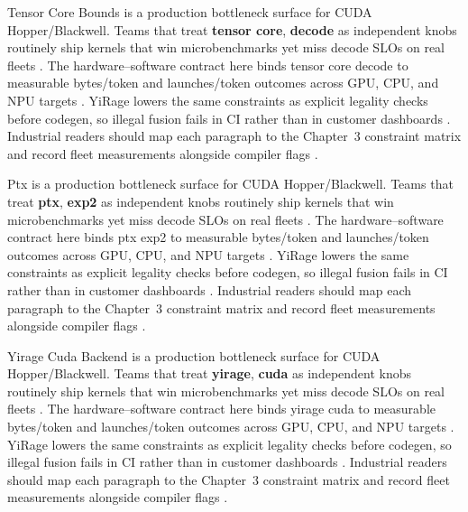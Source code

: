Tensor Core Bounds is a production bottleneck surface for CUDA Hopper/Blackwell. Teams that treat \textbf{tensor core}, \textbf{decode} as independent knobs routinely ship kernels that win microbenchmarks yet miss decode SLOs on real fleets \citep{nvidia2022hopper,amd2024aie}. The hardware--software contract here binds tensor core decode to measurable bytes/token and launches/token outcomes across GPU, CPU, and NPU targets \citep{semianalysis2024tma,dlbook}. YiRage lowers the same constraints as explicit legality checks before codegen, so illegal fusion fails in CI rather than in customer dashboards \citep{amd2024xdna,dao2022flashattention}. Industrial readers should map each paragraph to the Chapter~3 constraint matrix and record fleet measurements alongside compiler flags \citep{amd2024aie,kwon2023vllm}.

Ptx is a production bottleneck surface for CUDA Hopper/Blackwell. Teams that treat \textbf{ptx}, \textbf{exp2} as independent knobs routinely ship kernels that win microbenchmarks yet miss decode SLOs on real fleets \citep{semianalysis2024tma,dlbook}. The hardware--software contract here binds ptx exp2 to measurable bytes/token and launches/token outcomes across GPU, CPU, and NPU targets \citep{amd2024xdna,dao2022flashattention}. YiRage lowers the same constraints as explicit legality checks before codegen, so illegal fusion fails in CI rather than in customer dashboards \citep{amd2024aie,kwon2023vllm}. Industrial readers should map each paragraph to the Chapter~3 constraint matrix and record fleet measurements alongside compiler flags \citep{dlbook,nvidia2024cudagraphs}.

Yirage Cuda Backend is a production bottleneck surface for CUDA Hopper/Blackwell. Teams that treat \textbf{yirage}, \textbf{cuda} as independent knobs routinely ship kernels that win microbenchmarks yet miss decode SLOs on real fleets \citep{amd2024xdna,dao2022flashattention}. The hardware--software contract here binds yirage cuda to measurable bytes/token and launches/token outcomes across GPU, CPU, and NPU targets \citep{amd2024aie,kwon2023vllm}. YiRage lowers the same constraints as explicit legality checks before codegen, so illegal fusion fails in CI rather than in customer dashboards \citep{dlbook,nvidia2024cudagraphs}. Industrial readers should map each paragraph to the Chapter~3 constraint matrix and record fleet measurements alongside compiler flags \citep{dao2022flashattention,liu2024deepseekv3}.

